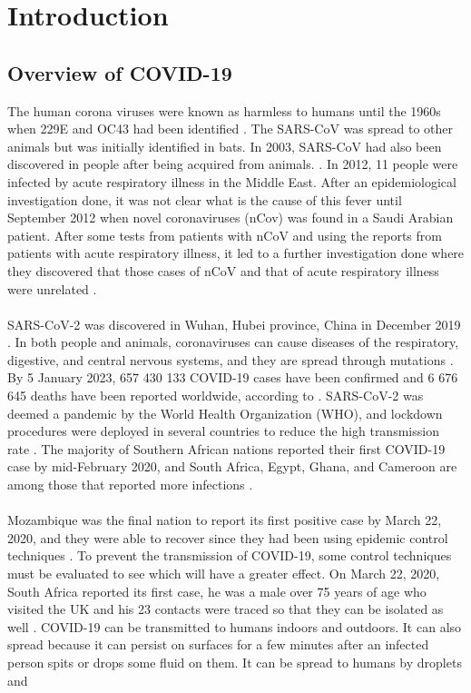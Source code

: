 \documentclass{article}
\begin{document}
\section{Introduction}
%
\setcounter{page}{1}
\subsection{Overview of COVID-19}
The human corona viruses were known as harmless to humans until the 1960s when 229E and OC43 had been identified \citep{yesudhas2021covid}. The SARS-CoV was spread to other animals but was initially identified in bats. In 2003, SARS-CoV had also been discovered in people after being acquired from animals. \citep{yesudhas2021covid}. In 2012, 11 people were infected by acute respiratory illness in the Middle East. After an epidemiological investigation done, it was not clear what is the cause of this fever until September 2012 when novel coronaviruses (nCov) was found in a Saudi Arabian patient. After some tests from patients with nCoV and using the reports from patients with acute respiratory illness, it led to a further investigation done where they discovered that those cases of nCoV and that of acute respiratory illness were unrelated \citep{hijawi2013novel}.\\\\SARS-CoV-2 was discovered in Wuhan, Hubei province, China in December 2019 \citep{giordano2020modelling}.  In both people and animals, coronaviruses can cause diseases of the respiratory, digestive, and central nervous systems, and they are spread through mutations \citep{yesudhas2021covid}. By 5 January 2023, 657 430 133 COVID-19 cases have been confirmed and 6 676 645 deaths have been reported worldwide, according to \citep{worldhealthorganisation}. SARS-CoV-2 was deemed a pandemic by the World Health Organization (WHO), and lockdown procedures were deployed in several countries to reduce the high transmission rate \citep{ciotti2020covid}. The majority of Southern African nations reported their first COVID-19 case by mid-February 2020, and South Africa, Egypt, Ghana, and Cameroon are among those that reported more infections \citep{sumbana2020air}.\\\\Mozambique was the final nation to report its first positive case by March 22, 2020, and they were able to recover since they had been using epidemic control techniques \citep{sumbana2020air, mishra2021mathematical}. To prevent the transmission of COVID-19, some control techniques must be evaluated to see which will have a greater effect. On March 22, 2020, South Africa reported its first case, he was a male over 75 years of age who visited the UK and his 23 contacts were traced so that they can be isolated as well \citep{sumbana2020air, mwiinde2022climatic}. COVID-19 can be transmitted to humans indoors and outdoors. It can also spread because it can persist on surfaces for a few minutes after an infected person spits or drops some fluid on them. It can be spread to humans by droplets and 
\end{document}
